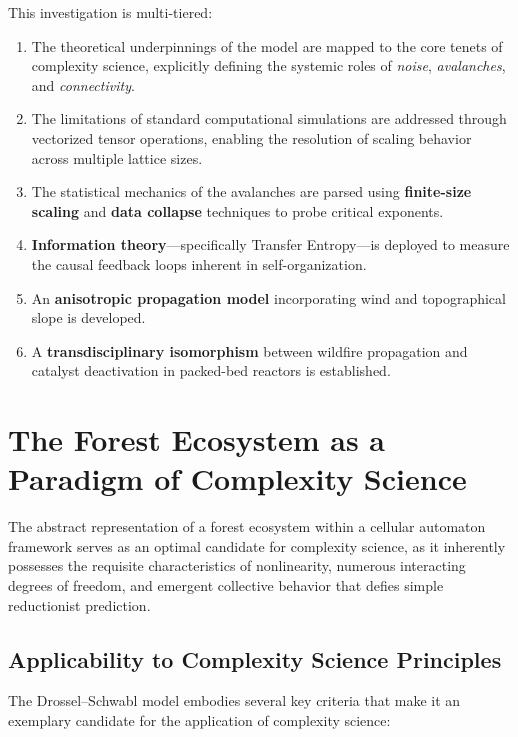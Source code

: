 \documentclass[12pt, a4paper]{article}
\begin{document}
This investigation is multi-tiered:
\begin{enumerate}[label=(\roman*)]
    \item The theoretical underpinnings of the model are mapped to the core tenets of complexity science, explicitly defining the systemic roles of \emph{noise}, \emph{avalanches}, and \emph{connectivity}.
    \item The limitations of standard computational simulations are addressed through vectorized tensor operations, enabling the resolution of scaling behavior across multiple lattice sizes.
    \item The statistical mechanics of the avalanches are parsed using \textbf{finite-size scaling} and \textbf{data collapse} techniques to probe critical exponents.
    \item \textbf{Information theory}---specifically Transfer Entropy---is deployed to measure the causal feedback loops inherent in self-organization.
    \item An \textbf{anisotropic propagation model} incorporating wind and topographical slope is developed.
    \item A \textbf{transdisciplinary isomorphism} between wildfire propagation and catalyst deactivation in packed-bed reactors is established.
\end{enumerate}


\section{The Forest Ecosystem as a Paradigm of Complexity Science}
\label{sec:system}

The abstract representation of a forest ecosystem within a cellular automaton framework serves as an optimal candidate for complexity science, as it inherently possesses the requisite characteristics of nonlinearity, numerous interacting degrees of freedom, and emergent collective behavior that defies simple reductionist prediction.

\subsection{Applicability to Complexity Science Principles}

The Drossel--Schwabl model embodies several key criteria that make it an exemplary candidate for the application of complexity science:
\end{document}
